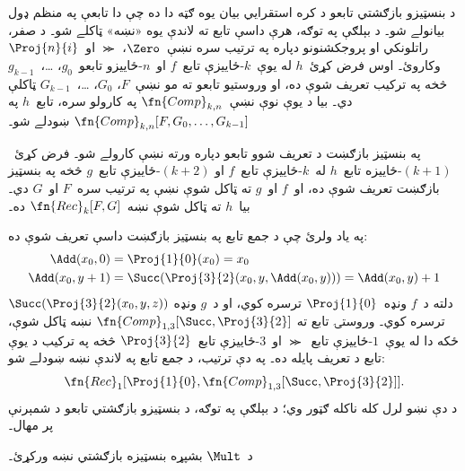 \documentclass[../../../include/open-logic-section]{subfiles}
\begin{document}

د بنسټيزو بازګشتي تابعو د کره استقرايي بيان يوه ګټه دا ده چې دا
تابعې په منظم ډول بيانولے شو۔ د بېلګې په توګه، هرې داسې تابع ته
لاندې يوه «نښه» ټاکلے شو۔ د صفر، راتلونکي او پروجکشنونو دپاره په
ترتيب سره نښې~$\Zero$، $\Succ$ او~$\Proj{n}{i}$ وکاروئ۔ اوس فرض
کړئ~$h$ له يوې~$k$-ځاييزې تابع~$f$ او~$n$-ځاييزو تابعو~$g_0$،
\dots،~$g_{k-1}$ څخه په ترکيب تعريف شوې ده، او وروستيو تابعو ته
مو نښې~$F$، $G_0$، \dots،~$G_{k-1}$ ټاکلې دي۔ بيا د يوې نوې
نښې~$\fn{Comp}_{k,n}$ په کارولو سره، تابع~$h$ په
$\fn{Comp}_{k,n}[F,G_0,\dots,G_{k-1}]$ ښودلے شو۔

په بنسټيز بازګښت د تعريف شوو تابعو دپاره ورته نښې کارولے شو۔ فرض
کړئ~$(k+1)$-ځاييزه تابع~$h$ له~$k$-ځاييزې تابع~$f$ او
$(k+2)$-ځاييزې تابع~$g$ څخه په بنسټيز بازګښت تعريف شوې ده، او~$f$
او~$g$ ته ټاکل شوې نښې په ترتيب سره~$F$ او~$G$ دي۔ بيا~$h$ ته
ټاکل شوې نښه~$\fn{Rec}_k[F,G]$ ده۔

په ياد ولرئ چې د جمع تابع په بنسټيز بازګښت داسې تعريف شوې ده:
\begin{align*}
  \Add(x_0, 0) & = \Proj{1}{0}(x_0) = x_0\\
  \Add(x_0, y+1) & = \Succ(\Proj{3}{2}(x_0, y, \Add(x_0, y))) = \Add(x_0, y) +1
\end{align*}
دلته د~$f$ ونډه~$\Proj{1}{0}$ ترسره کوي، او د~$g$ ونډه
$\Succ(\Proj{3}{2}(x_0, y, z))$ ترسره کوي۔ وروستۍ تابع ته
$\fn{Comp}_{1,3}[\Succ,\Proj{3}{2}]$ نښه ټاکل شوې، ځکه دا له
يوې~$1$-ځاييزې تابع~$\Succ$ او~$3$-ځاييزې تابع~$\Proj{3}{2}$ څخه په
ترکيب د يوې تابع د تعريف پايله ده۔ په دې ترتيب، د جمع تابع په لاندې
نښه ښودلے شو:
\[
\fn{Rec}_1[\Proj{1}{0},\fn{Comp}_{1,3}[\Succ,\Proj{3}{2}]].
\]
د دې نښو لرل کله ناکله ګټور وي؛ د بېلګې په توګه، د بنسټيزو
بازګشتي تابعو د شمېرنې پر مهال۔

\begin{prob}
  د~$\Mult$ بشپړه بنسټيزه بازګشتي نښه ورکړئ۔
\end{prob}
\end{document}
